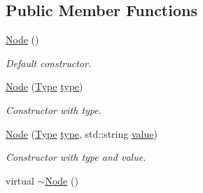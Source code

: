 \subsection*{Public Member Functions}
\begin{DoxyCompactItemize}
\item 
\hypertarget{classNode_ad7a34779cad45d997bfd6d3d8043c75f}{}\hyperlink{classNode_ad7a34779cad45d997bfd6d3d8043c75f}{Node} ()\label{classNode_ad7a34779cad45d997bfd6d3d8043c75f}

\begin{DoxyCompactList}\small\item\em Default constructor. \end{DoxyCompactList}\item 
\hyperlink{classNode_a4122dca231612c6fd2eb17fd92a02892}{Node} (\hyperlink{classNode_a8dad370be1595f49e0a7c2406a91e867}{Type} \hyperlink{classNode_adcaf01927a597ad0e6025b173fe5e552}{type})
\begin{DoxyCompactList}\small\item\em Constructor with type. \end{DoxyCompactList}\item 
\hyperlink{classNode_a36ce067b8b3fde59af074a425fa3b97c}{Node} (\hyperlink{classNode_a8dad370be1595f49e0a7c2406a91e867}{Type} \hyperlink{classNode_adcaf01927a597ad0e6025b173fe5e552}{type}, std\+::string \hyperlink{classNode_a51de8a12e67206f893b0bd6c2afeb11c}{value})
\begin{DoxyCompactList}\small\item\em Constructor with type and value. \end{DoxyCompactList}\item 
\hypertarget{classNode_aa0840c3cb5c7159be6d992adecd2097c}{}virtual \hyperlink{classNode_aa0840c3cb5c7159be6d992adecd2097c}{$\sim$\+Node} ()\label{classNode_aa0840c3cb5c7159be6d992adecd2097c}


\end{DoxyCompactItemize}
